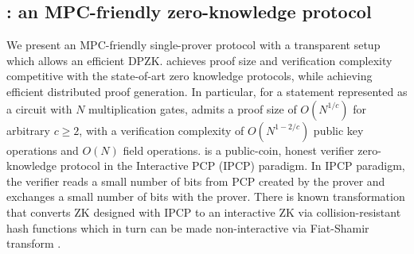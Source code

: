 \subsection{\name{}: an MPC-friendly zero-knowledge protocol}
We present an MPC-friendly single-prover protocol \name{} with a transparent setup which
allows an efficient  DPZK.
\name{} achieves proof size and verification complexity competitive with the
state-of-art zero knowledge protocols, while achieving efficient distributed
proof generation. In particular, for a statement represented as a circuit with $N$ multiplication gates,
\name{} admits a proof size of $O(N^{1/c})$ for
arbitrary $c\geq 2$, with a verification complexity of $O(N^{1-2/c})$ public key
operations and $O(N)$ field operations. \name{} is a public-coin, honest verifier
zero-knowledge protocol in the Interactive PCP (IPCP) \cite{KR08, KR09, GIMS10,ligero}
paradigm. In IPCP paradigm, the verifier reads a small number of bits from PCP created by the prover and exchanges a small number of bits with the prover.
There is known transformation that converts ZK designed with IPCP to an interactive ZK via collision-resistant hash functions \cite{IshaiMS12, IshaiW14} which in turn can be made non-interactive   via Fiat-Shamir transform \cite{FS86, BCS16}. 



%


